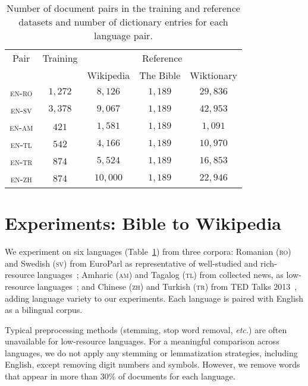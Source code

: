 

\begin{table}
	\centering
	\small
	\setlength\tabcolsep{3pt}
	\begin{tabular}{c|c|ccc}
		\hline
		Pair & Training &\multicolumn{3}{c}{Reference} \\ \cline{3-5}
		 &  & \multicolumn{1}{c}{Wikipedia} & The Bible & Wiktionary\\ \hline\hline
		\textsc{en-ro} &  $1{,}272$ & $8{,}126$ & $1{,}189$ & $29{,}836$ \\ \hline
		\textsc{en-sv} & $3{,}378$ & $9{,}067$ & $1{,}189$ & $42{,}953$ \\ \hline
		\textsc{en-am}  & $421$  & $1{,}581$ & $1{,}189$ & $1{,}091$ \\ \hline
		\textsc{en-tl}  & $542$  & $4{,}166$ & $1{,}189$ & $10{,}970$ \\ \hline
		\textsc{en-tr}  & $874$ & $5{,}524$ & $1{,}189$ & $16{,}853$\\ \hline
		\textsc{en-zh}  & $874$ & $10{,}000$ & $1{,}189$ & $22{,}946$\\ \hline
	\end{tabular}
	\caption{Number of document pairs in the training and reference datasets and number of dictionary entries for each language pair.}
	\label{tab:dataset}
\end{table}

\section{Experiments: Bible to Wikipedia}
\label{sec:settings}

We experiment on six languages (Table~\ref{tab:dataset}) from three
corpora: Romanian (\textsc{ro}) and Swedish (\textsc{sv}) from
EuroParl as representative of well-studied and rich-resource
languages~\cite{europarl}; Amharic (\textsc{am}) and Tagalog
(\textsc{tl}) from collected news, as low-resource
languages~\cite{amharicdata,tagalogdata}; and Chinese (\textsc{zh})
and Turkish (\textsc{tr}) from TED Talks 2013~\cite{Tiedemann12},
adding language variety to our experiments. Each language is
 paired with English as a bilingual corpus.

 Typical preprocessing methods (stemming, stop word removal,
 \textit{etc.}) are often unavailable for low-resource languages. For
 a meaningful comparison across languages, we do not apply any
 stemming or lemmatization strategies, including English, except
 removing digit numbers and symbols. However, we remove words that
 appear in more than $30\%$ of documents for each language.

